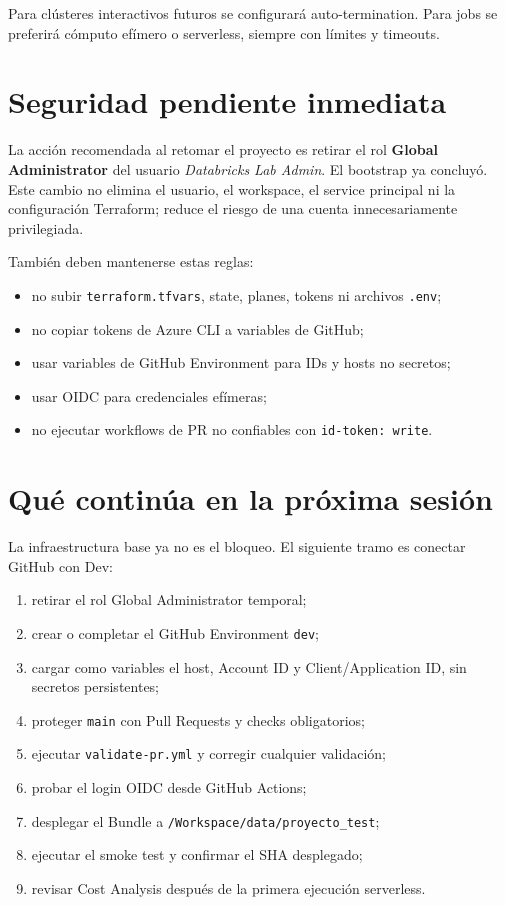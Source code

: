 \documentclass[11pt,a4paper]{article}
\begin{document}
Para clústeres interactivos futuros se configurará auto-termination. Para jobs se preferirá cómputo
efímero o serverless, siempre con límites y timeouts.

\section{Seguridad pendiente inmediata}

La acción recomendada al retomar el proyecto es retirar el rol \textbf{Global Administrator} del
usuario \textit{Databricks Lab Admin}. El bootstrap ya concluyó. Este cambio no elimina el usuario,
el workspace, el service principal ni la configuración Terraform; reduce el riesgo de una cuenta
innecesariamente privilegiada.

También deben mantenerse estas reglas:

\begin{itemize}
  \item no subir \texttt{terraform.tfvars}, state, planes, tokens ni archivos \texttt{.env};
  \item no copiar tokens de Azure CLI a variables de GitHub;
  \item usar variables de GitHub Environment para IDs y hosts no secretos;
  \item usar OIDC para credenciales efímeras;
  \item no ejecutar workflows de PR no confiables con \texttt{id-token: write}.
\end{itemize}

\section{Qué continúa en la próxima sesión}

La infraestructura base ya no es el bloqueo. El siguiente tramo es conectar GitHub con Dev:

\begin{enumerate}
  \item retirar el rol Global Administrator temporal;
  \item crear o completar el GitHub Environment \texttt{dev};
  \item cargar como variables el host, Account ID y Client/Application ID, sin secretos persistentes;
  \item proteger \texttt{main} con Pull Requests y checks obligatorios;
  \item ejecutar \texttt{validate-pr.yml} y corregir cualquier validación;
  \item probar el login OIDC desde GitHub Actions;
  \item desplegar el Bundle a \texttt{/Workspace/data/proyecto\_test};
  \item ejecutar el smoke test y confirmar el SHA desplegado;
  \item revisar Cost Analysis después de la primera ejecución serverless.
\end{enumerate}
\end{document}
